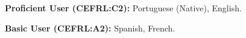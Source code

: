 

\begin{cventries}

  \cventry
    {}
    {}
    {}
    {} 
    {
	  \vspace{-1.0cm}
      \begin{cvitems} %
        \item[] {\hspace{-.31cm}\textbf{Proficient User (CEFRL:C2):} Portuguese (Native), English.}
        \item[] {\hspace{-.31cm}\textbf{Basic User (CEFRL:A2):} Spanish, French.}
      \end{cvitems}
    }

\end{cventries}
